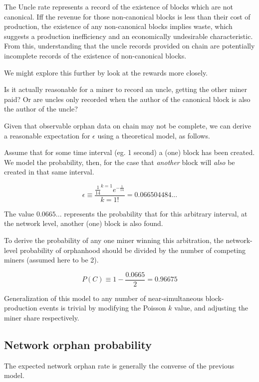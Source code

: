 \documentclass[11pt]{article}
\theoremstyle{plain}
\begin{document}
{{{  The Uncle rate represents a record of the existence of blocks which are not
canonical.
  Iff the revenue for those non-canonical blocks is less than their cost of
production, the existence of any non-canonical blocks implies waste, which
suggests a production inefficiency and an economically undesirable
characteristic.
  From this, understanding that the uncle records provided on chain are
potentially incomplete records of the existence of non-canonical blocks.

  We might explore this further by look at the rewards more closely.

  Is it actually reasonable for a miner to record an uncle, getting the
  other miner paid? Or are uncles only recorded when the author of the
  canonical block is also the author of the uncle?
}}
Given that observable orphan data on chain may not be complete,
we can derive a reasonable expectation for $\epsilon$ using a
theoretical model, as follows.

Assume that for some time interval (eg. 1 second) a (one) block has been created.
We model the probability, then, for the case that \emph{another} block
will \emph{also} be created in that same interval.

\begin{equation}
    \epsilon \equiv \frac{\frac{1}{14}^{k=1}e^{-\frac{1}{14}}}{k=1!} = 0.066504484...
\end{equation}

The value $0.0665...$ represents the probability that for this arbitrary interval,
at the network level, another (one) block is also found.

To derive the probability of any one miner winning this arbitration,
the network-level probability of orphanhood should be divided by the number
of competing miners (assumed here to be 2).

\begin{equation}
    P(C) \equiv 1 - \frac{0.0665}{2} = 0.96675
\end{equation}

Generalization of this model to any number of near-simultaneous block-production events
is trivial by modifying the Poisson $k$ value, and adjusting the miner share respectively.

\subsection{\normalsize{Network orphan probability}}

The expected network orphan rate is generally the converse of the previous model.

}
\end{document}
